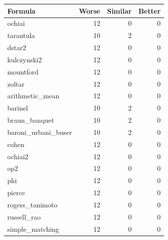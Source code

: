 \begin{tabular}{lrrr}
\hline
Formula & Worse & Similar & Better \\
\hline
ochiai & 12 & 0 & 0 \\
tarantula & 10 & 2 & 0 \\
dstar2 & 12 & 0 & 0 \\
kulczynski2 & 12 & 0 & 0 \\
mountford & 12 & 0 & 0 \\
zoltar & 12 & 0 & 0 \\
arithmetic\_mean & 12 & 0 & 0 \\
barinel & 10 & 2 & 0 \\
braun\_banquet & 10 & 2 & 0 \\
baroni\_urbani\_buser & 10 & 2 & 0 \\
cohen & 12 & 0 & 0 \\
ochiai2 & 12 & 0 & 0 \\
op2 & 12 & 0 & 0 \\
phi & 12 & 0 & 0 \\
pierce & 12 & 0 & 0 \\
rogers\_tanimoto & 12 & 0 & 0 \\
russell\_rao & 12 & 0 & 0 \\
simple\_matching & 12 & 0 & 0 \\
\hline
\end{tabular}
